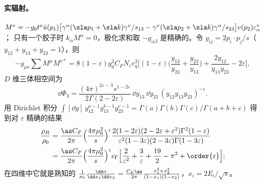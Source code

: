 \paragraph{实辐射。}
$M^\nu=-g_0t^a\bar u(p_1)\big[\gamma^\alpha(\sla p_1+\sla k)\gamma^\nu/s_{13}-\gamma^\nu(\sla p_2+\sla k)\gamma^\alpha/s_{23}\big]v(p_2)\varepsilon^*_\alpha$；
只有一个胶子时 $k_\alpha M^\alpha=0$，极化求和取 $-g_{\alpha\beta}$ 是精确的。令 $y_{ij}=2p_i\cdot p_j/s$（$y_{12}+y_{13}+y_{23}=1$），则
\begin{equation}\label{eq:ee-real-me}
-g_{\mu\nu}\sum M^\mu M^{\nu*}=8(1-\varepsilon)g_0^2C_FN_ce_q^2\Big[(1-\varepsilon)\Big(\frac{y_{13}}{y_{23}}+\frac{y_{23}}{y_{13}}\Big)+\frac{2y_{12}}{y_{13}y_{23}}-2\varepsilon\Big],
\end{equation}
$D$ 维三体相空间为
\begin{equation}\label{eq:ee-Phi3}
\dd\Phi_3=\frac{(4\pi)^{2\varepsilon-3}s^{1-2\varepsilon}}{2\Gamma(2-2\varepsilon)}\,\dd y_{13}\,\dd y_{23}\,(y_{12}y_{13}y_{23})^{-\varepsilon}.
\end{equation}
用 Dirichlet 积分 $\int[\dd y]\,y_{12}^{a-1}y_{13}^{b-1}y_{23}^{c-1}=\Gamma(a)\Gamma(b)\Gamma(c)/\Gamma(a+b+c)$ 得到对 $\varepsilon$ 精确的结果
\begin{equation}\label{eq:ee-real}
\begin{split}
\frac{\rho_R}{\rho_0}&=\frac{\as C_F}{2\pi}\Big(\frac{4\pi\mu_0^2}{s}\Big)^{\varepsilon}
\frac{2(1-2\varepsilon)(2-2\varepsilon+\varepsilon^2)\Gamma^2(1-\varepsilon)}{\varepsilon^2(1-3\varepsilon)(2-3\varepsilon)\Gamma(1-3\varepsilon)}\\
&=\frac{\as C_F}{2\pi}\Big(\frac{4\pi\mu_0^2}{s}\Big)^{\varepsilon}c_\Gamma\Big[\frac{2}{\varepsilon^2}+\frac{3}{\varepsilon}+\frac{19}{2}-\pi^2+\order{\varepsilon}\Big];
\end{split}
\end{equation}
在四维中它就是熟知的 $\frac{1}{\sigma_0}\frac{\dd\sigma}{\dd x_1\dd x_2}=\frac{C_F\as}{2\pi}\frac{x_1^2+x_2^2}{(1-x_1)(1-x_2)}$，$x_i=2E_i/\sqrt s$。

